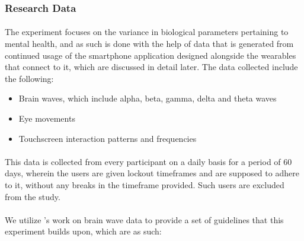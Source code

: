 \documentclass{article}
\begin{document}
\subsubsection{Research Data}

\paragraph{} The experiment focuses on the variance in biological parameters pertaining to mental health, and as such is done with the help of data that is generated from continued usage of the smartphone application designed alongside the wearables that connect to it, which are discussed in detail later. The data collected include the following:

\begin{itemize}
    \item Brain waves, which include alpha, beta, gamma, delta and theta waves
    \item Eye movements
    \item Touchscreen interaction patterns and frequencies
\end{itemize}

\paragraph{} This data is collected from every participant on a daily basis for a period of 60 days, wherein the users are given lockout timeframes and are supposed to adhere to it, without any breaks in the timeframe provided. Such users are excluded from the study.

\paragraph{} We utilize \citeauthor{buzsaki2006rhythms}'s work\cite{buzsaki2006rhythms} on brain wave data to provide a set of guidelines that this experiment builds upon, which are as such:
\end{document}
